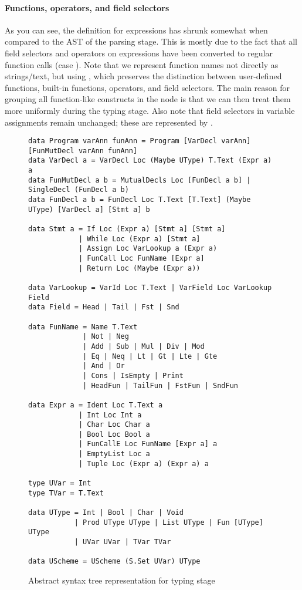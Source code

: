 \paragraph{Functions, operators, and field selectors}
As you can see, the definition for expressions has shrunk somewhat when compared
to the AST of the parsing stage. This is mostly due to the fact that all field
selectors and operators on expressions have been converted to regular function
calls (case ). Note that we represent function names not
directly as strings/text, but using , which preserves the
distinction between user-defined functions, built-in functions, operators, and
field selectors.
The main reason for grouping all function-like constructs in the
 node is that we can then treat them more uniformly during the
typing stage.
Also note that field selectors in variable assignments remain unchanged; these
are represented by .


\begin{figure}
\begin{verbatim}
data Program varAnn funAnn = Program [VarDecl varAnn] [FunMutDecl varAnn funAnn]
data VarDecl a = VarDecl Loc (Maybe UType) T.Text (Expr a) a
data FunMutDecl a b = MutualDecls Loc [FunDecl a b] | SingleDecl (FunDecl a b)
data FunDecl a b = FunDecl Loc T.Text [T.Text] (Maybe UType) [VarDecl a] [Stmt a] b

data Stmt a = If Loc (Expr a) [Stmt a] [Stmt a]
            | While Loc (Expr a) [Stmt a]
            | Assign Loc VarLookup a (Expr a)
            | FunCall Loc FunName [Expr a]
            | Return Loc (Maybe (Expr a))

data VarLookup = VarId Loc T.Text | VarField Loc VarLookup Field
data Field = Head | Tail | Fst | Snd

data FunName = Name T.Text
             | Not | Neg
             | Add | Sub | Mul | Div | Mod
             | Eq | Neq | Lt | Gt | Lte | Gte
             | And | Or
             | Cons | IsEmpty | Print
             | HeadFun | TailFun | FstFun | SndFun

data Expr a = Ident Loc T.Text a
            | Int Loc Int a
            | Char Loc Char a
            | Bool Loc Bool a
            | FunCallE Loc FunName [Expr a] a
            | EmptyList Loc a
            | Tuple Loc (Expr a) (Expr a) a

type UVar = Int
type TVar = T.Text

data UType = Int | Bool | Char | Void
           | Prod UType UType | List UType | Fun [UType] UType
           | UVar UVar | TVar TVar

data UScheme = UScheme (S.Set UVar) UType
\end{verbatim}

\caption{Abstract syntax tree representation for typing stage}
\label{fig:type-ast}
\end{figure}


